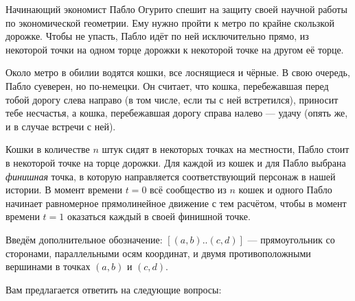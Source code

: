 \vspace{-0.35cm} 

\ms Начинающий экономист Пабло Огурито спешит на защиту своей научной работы по экономической геометрии. Ему нужно пройти к метро по крайне скользкой дорожке. Чтобы не упасть, Пабло идёт по ней исключительно прямо, из некоторой точки на одном торце дорожки к некоторой точке на другом её торце.

\ms Около метро в обилии водятся кошки, все лоснящиеся и чёрные. В свою очередь, Пабло суеверен, но по-немецки. Он считает, что кошка, перебежавшая перед тобой дорогу слева направо (в том числе, если ты с ней встретился), приносит тебе несчастья, а кошка, перебежавшая дорогу справа налево — удачу (опять же, и в случае встречи с ней).

\ms Кошки в количестве $n$ штук сидят в некоторых точках на местности, Пабло стоит в некоторой точке на торце дорожки. Для каждой из кошек и для Пабло выбрана {\it финишная} точка, в которую направляется соответствующий персонаж в нашей истории. В момент времени $t=0$ всё сообщество из $n$ кошек и одного Пабло начинает равномерное прямолинейное движение с тем расчётом, чтобы в момент времени $t=1$ оказаться каждый в своей финишной точке.

\ms Введём дополнительное обозначение: $[(a,b)..(c,d)]$ --- прямоугольник со сторонами, параллельными осям координат, и двумя противоположными вершинами в точках $(a,b)$ и $(c,d)$.

\ms Вам предлагается ответить на следующие вопросы:

